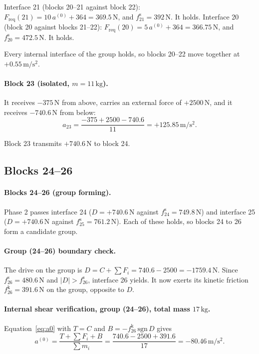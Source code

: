 \documentclass[11pt,a4paper]{article}
\begin{document}
Interface 21 (blocks 20--21 against block 22): $F_{\mathrm{req}}(21)=10\,a^{(0)} + 364=369.5\,\mathrm{N}$, and $f^{\mathrm s}_{21}=392\,\mathrm{N}$. It holds. Interface 20 (block 20 against blocks 21--22): $F_{\mathrm{req}}(20)=5\,a^{(0)} + 364=366.75\,\mathrm{N}$, and $f^{\mathrm s}_{20}=472.5\,\mathrm{N}$. It holds.

Every internal interface of the group holds, so blocks 20--22 move together at $+0.55\,\mathrm{m/s^2}$.

\paragraph{Block 23 (isolated, $m=11\,\mathrm{kg}$).} It receives $-375\,\mathrm{N}$ from above, carries an external force of $+2500\,\mathrm{N}$, and it receives $-740.6\,\mathrm{N}$ from below:\[a_{23}=\dfrac{-375 + 2500 - 740.6}{11}=+125.85\,\mathrm{m/s^2}.\]

Block 23 transmits $+740.6\,\mathrm{N}$ to block 24.

\subsection{Blocks 24--26}
\paragraph{Blocks 24--26 (group forming).} Phase 2 passes interface 24 ($D=+740.6\,\mathrm{N}$ against $f^{\mathrm s}_{24}=749.8\,\mathrm{N}$) and interface 25 ($D=+740.6\,\mathrm{N}$ against $f^{\mathrm s}_{25}=761.2\,\mathrm{N}$). Each of these holds, so blocks 24 to 26 form a candidate group.

\paragraph{Group (24--26) boundary check.} The drive on the group is $D=C+\sum F_i=740.6 - 2500=-1759.4\,\mathrm{N}$. Since $f^{\mathrm s}_{26}=480.6\,\mathrm{N}$ and $|D|>f^{\mathrm s}_{26}$, interface 26 yields. It now exerts its kinetic friction $f^{\mathrm k}_{26}=391.6\,\mathrm{N}$ on the group, opposite to $D$.

\paragraph{Internal shear verification, group (24--26), total mass $17\,\mathrm{kg}$.} Equation~\eqref{eq:a0} with $T=C$ and $B=-f^{\mathrm k}_{26}\,\mathrm{sgn}\,D$ gives\[a^{(0)}=\dfrac{T+\sum F_i+B}{\sum m_i}=\dfrac{740.6 - 2500 + 391.6}{17}=-80.46\,\mathrm{m/s^2}.\]
\end{document}
